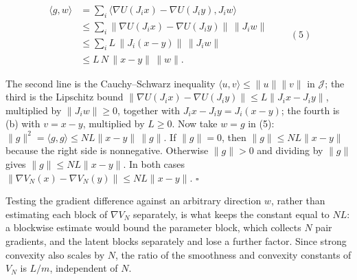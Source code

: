 \documentclass[11pt,a4paper]{article}
\begin{document}
\[\begin{aligned}\langle g,w\rangle&=\sum_i\bigl\langle\nabla U(J_ix)-\nabla U(J_iy),J_iw\bigr\rangle\\&\le\sum_i\bigl\|\nabla U(J_ix)-\nabla U(J_iy)\bigr\|\,\|J_iw\|\\&\le\sum_iL\,\|J_i(x-y)\|\,\|J_iw\|\\&\le L\,N\,\|x-y\|\,\|w\| .\end{aligned}\qquad(5)\]


The second line is the Cauchy–Schwarz inequality \(\langle u,v\rangle\le\|u\|\|v\|\) in \(\mathcal J\); the third is the Lipschitz bound \(\|\nabla U(J_ix)-\nabla U(J_iy)\|\le L\|J_ix-J_iy\|\), multiplied by \(\|J_iw\|\ge0\), together with \(J_ix-J_iy=J_i(x-y)\); the fourth is (b) with \(v=x-y\), multiplied by \(L\ge0\). Now take \(w=g\) in (5): \(\|g\|^2=\langle g,g\rangle\le NL\|x-y\|\,\|g\|\). If \(\|g\|=0\), then \(\|g\|\le NL\|x-y\|\) because the right side is nonnegative. Otherwise \(\|g\|>0\) and dividing by \(\|g\|\) gives \(\|g\|\le NL\|x-y\|\). In both cases \(\|\nabla V_N(x)-\nabla V_N(y)\|\le NL\|x-y\|\). \(\square\)




Testing the gradient difference against an arbitrary direction \(w\), rather than estimating each block of \(\nabla V_N\) separately, is what keeps the constant equal to \(NL\): a blockwise estimate would bound the parameter block, which collects \(N\) pair gradients, and the latent blocks separately and lose a further factor. Since strong convexity also scales by \(N\), the ratio of the smoothness and convexity constants of \(V_N\) is \(L/m\), independent of \(N\).
\end{document}
